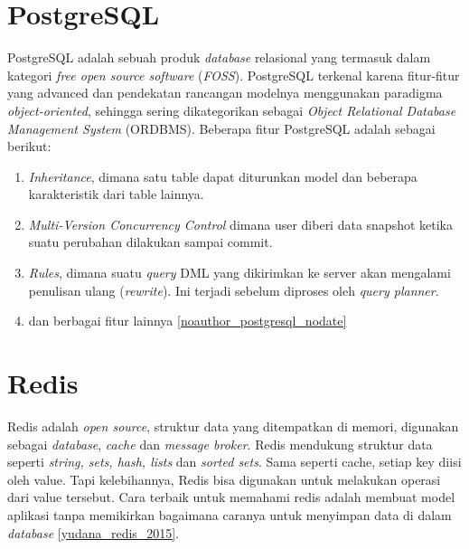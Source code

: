 	\section{PostgreSQL}
	PostgreSQL adalah sebuah produk \textit{database} relasional yang termasuk dalam kategori \textit{free open source software} (\textit{FOSS}). 
	PostgreSQL terkenal karena fitur-fitur yang advanced dan pendekatan rancangan modelnya menggunakan paradigma \textit{object-oriented}, sehingga sering dikategorikan sebagai \textit{Object Relational Database Management System} (ORDBMS).
	Beberapa fitur PostgreSQL adalah sebagai berikut:
	\begin{enumerate}
	   	\item \textit{Inheritance}, dimana satu table dapat diturunkan model dan beberapa karakteristik dari table lainnya.
	   	\item \textit{Multi-Version Concurrency Control} dimana user diberi data snapshot ketika suatu perubahan dilakukan sampai commit.
	   	\item \textit{Rules}, dimana suatu \textit{query} DML yang dikirimkan ke server akan mengalami penulisan ulang (\textit{rewrite}). Ini terjadi sebelum diproses oleh \textit{query planner}.
	   	\item dan berbagai fitur lainnya \ref{noauthor_postgresql_nodate}
	\end{enumerate}
	
	\section{Redis}
	Redis adalah \textit{open source}, struktur data yang ditempatkan di memori, digunakan sebagai \textit{database}, \textit{cache} dan \textit{message broker}. Redis mendukung struktur data seperti \textit{string, sets, hash, lists} dan \textit{sorted sets}. Sama seperti cache, setiap key diisi oleh value. Tapi kelebihannya, Redis bisa digunakan untuk melakukan operasi dari value tersebut. Cara terbaik untuk memahami redis adalah membuat model aplikasi tanpa memikirkan bagaimana caranya untuk menyimpan data di dalam \textit{database} \ref{yudana_redis_2015}.
	
